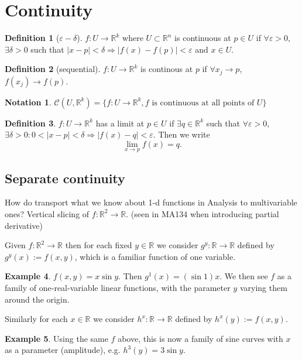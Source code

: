 \documentclass[a4paper]{article}
\theoremstyle{definition}
\newtheorem{defn}{Definition}[subsection]
\newtheorem{eg}[defn]{Example}
\newtheorem*{notation}{Notation}
\begin{document}
\section{Continuity}
\begin{defn} [$\varepsilon-\delta$]
	$f:U\rightarrow \mathbb R^k$ where $U \subset \mathbb R ^n$ is continuous at $p\in U$ if $\forall \varepsilon >0$, $\exists \delta >0$ such that $|x-p|<\delta \Rightarrow |f(x)-f(p)| < \varepsilon$ and $x\in U$.
\end{defn}
\begin{defn} [sequential]
	$f:U\rightarrow \mathbb R^k$ is continous at $p$ if $\forall x_j \rightarrow p$, $f(x_j) \rightarrow f(p)$.
\end{defn}
\begin{notation}
	$\mathcal C (U, \mathbb R^k) = \{ f: U \rightarrow \mathbb R^k, f\text{ is continuous at all points of }U \}$
\end{notation}
\begin{defn}
	$f:U\rightarrow \mathbb R^k$ has a limit at $p\in U$ if $\exists q \in \mathbb R^k$ such that $\forall \varepsilon >0$, $\exists \delta >0 : 0<|x-p|<\delta \Rightarrow |f(x)-q|<\varepsilon$. Then we write
\[
\lim_{x\rightarrow p} f(x)=q.
\]
\end{defn}
\subsection{Separate continuity}
How do transport what we know about 1-d functions in Analysis to multivariable ones? Vertical slicing of $f: \mathbb R^2 \rightarrow \mathbb R$. (seen in MA134 when introducing partial derivative)

Given $f: \mathbb R^2 \rightarrow \mathbb R$ then for each fixed $y \in \mathbb R$ we consider $g^y : \mathbb R \rightarrow \mathbb R$ defined by $g^y(x) := f(x,y)$, which is a familiar function of one variable.

\begin{eg}
	$f(x,y)=x \sin y.$ Then $g^1(x) = (\sin 1) x$. We then see $f$ as a family of one-real-variable linear functions, with the parameter $y$ varying them around the origin.
\end{eg}

Similarly for each $x\in \mathbb R$ we consider $h^x : \mathbb R \rightarrow \mathbb R$ defined by $h^x(y) := f(x,y).$

\begin{eg}
	Using the same $f$ above, this is now a family of sine curves with $x$ as a parameter (amplitude), e.g. $h^3(y)=3\sin y.$
\end{eg}
\end{document}
